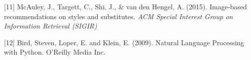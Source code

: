 \documentclass{article} %
\begin{document}
{[11] McAuley, J., Targett, C., Shi, J., \& van den Hengel, A. (2015). Image-based recommendations on styles and substitutes. {\it ACM Special Interest Group on Information Retrieval (SIGIR)}

[12] Bird, Steven, Loper, E. and Klein, E. (2009). Natural Language Processing with Python. O’Reilly Media Inc.





%
%



}
\end{document}
